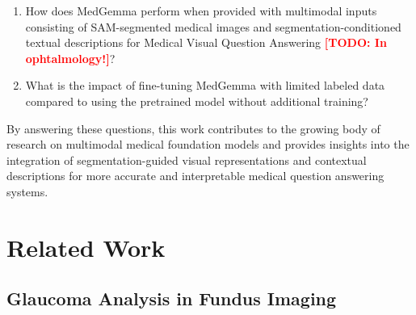 \documentclass[runningheads]{llncs}
\newcommand{\todo}[1]{\textcolor{red}{\textbf{[TODO: #1]}}}
\begin{document}
\begin{enumerate}

  \item How does MedGemma perform when provided with multimodal inputs consisting of \gls{SAM}-segmented medical images and segmentation-conditioned textual descriptions for Medical Visual Question Answering \todo{In ophtalmology!}?

  \item What is the impact of fine-tuning MedGemma with limited labeled data compared to using the pretrained model without additional training?
\end{enumerate}

By answering these questions, this work contributes to the growing body of research on multimodal medical foundation models and provides insights into the integration of segmentation-guided visual representations and contextual descriptions for more accurate and interpretable medical question answering systems.


\cite{pmlr-v136-oala20a}

\section{Related Work}
\subsection{Glaucoma Analysis in Fundus Imaging}
\label{subsec:glaucoma}

\end{document}
